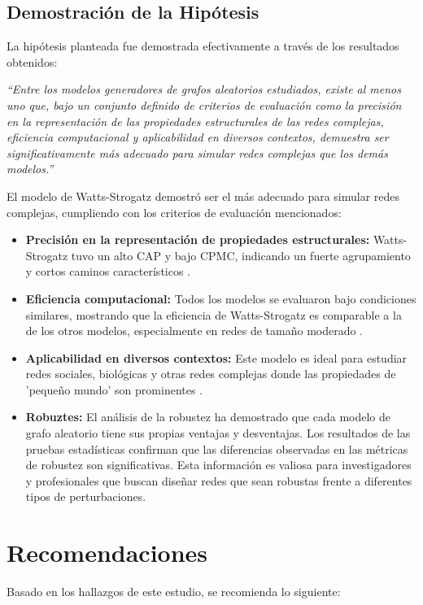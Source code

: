 \subsection*{Demostración de la Hipótesis}

La hipótesis planteada fue demostrada efectivamente a través de los resultados obtenidos:

\textit{``Entre los modelos generadores de grafos aleatorios estudiados, existe al menos uno que, bajo un conjunto definido de criterios de evaluación como la precisión en la representación de las propiedades estructurales de las redes complejas, eficiencia computacional y aplicabilidad en diversos contextos, demuestra ser significativamente más adecuado para simular redes complejas que los demás modelos.''}

El modelo de Watts-Strogatz demostró ser el más adecuado para simular redes complejas, cumpliendo con los criterios de evaluación mencionados:
\begin{itemize}
    \item \textbf{Precisión en la representación de propiedades estructurales:} Watts-Strogatz tuvo un alto CAP y bajo CPMC, indicando un fuerte agrupamiento y cortos caminos característicos .
    \item \textbf{Eficiencia computacional:} Todos los modelos se evaluaron bajo condiciones similares, mostrando que la eficiencia de Watts-Strogatz es comparable a la de los otros modelos, especialmente en redes de tamaño moderado .
    \item \textbf{Aplicabilidad en diversos contextos:} Este modelo es ideal para estudiar redes sociales, biológicas y otras redes complejas donde las propiedades de 'pequeño mundo' son prominentes .
    \item \textbf{Robuztes:} El análisis de la robustez ha demostrado que cada modelo de grafo aleatorio tiene sus propias ventajas y desventajas. Los resultados de las pruebas estadísticas confirman que las diferencias observadas en las métricas de robustez son significativas. Esta información es valiosa para investigadores y profesionales que buscan diseñar redes que sean robustas frente a diferentes tipos de perturbaciones.
\end{itemize}

\section{Recomendaciones}

Basado en los hallazgos de este estudio, se recomienda lo siguiente:

